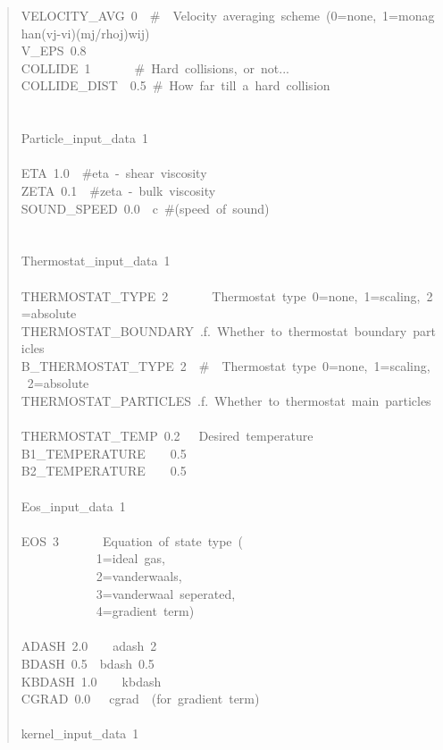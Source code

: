\begin{quote}
{VELOCITY{\_}AVG~0~~{\#}~~Velocity~averaging~scheme~(0=none,~1=monaghan(vj-vi)(mj/rhoj)wij)~\\
V{\_}EPS~0.8~\\
COLLIDE~1~~~~~~~{\#}~Hard~collisions,~or~not...~\\
COLLIDE{\_}DIST~~0.5~{\#}~How~far~till~a~hard~collision~\\
~\\
~\\
Particle{\_}input{\_}data~1~\\
~\\
ETA~1.0~~{\#}eta~-~shear~viscosity~\\
ZETA~0.1~~{\#}zeta~-~bulk~viscosity~\\
SOUND{\_}SPEED~0.0~~c~{\#}(speed~of~sound)~\\
~\\
~\\
Thermostat{\_}input{\_}data~1~\\
~\\
THERMOSTAT{\_}TYPE~2~~~~~~~Thermostat~type~0=none,~1=scaling,~2=absolute~\\
THERMOSTAT{\_}BOUNDARY~.f.~Whether~to~thermostat~boundary~particles~\\
B{\_}THERMOSTAT{\_}TYPE~2~~{\#}~~Thermostat~type~0=none,~1=scaling,~2=absolute~\\
THERMOSTAT{\_}PARTICLES~.f.~Whether~to~thermostat~main~particles~\\
THERMOSTAT{\_}TEMP~0.2~~~Desired~temperature~\\
B1{\_}TEMPERATURE~~~~0.5~\\
B2{\_}TEMPERATURE~~~~0.5~\\
~\\
Eos{\_}input{\_}data~1~\\
~\\
EOS~3~~~~~~~Equation~of~state~type~(~\\
~~~~~~~~~~~~1=ideal~gas,~\\
~~~~~~~~~~~~2=vanderwaals,~\\
~~~~~~~~~~~~3=vanderwaal~seperated,~\\
~~~~~~~~~~~~4=gradient~term)~\\
~\\
ADASH~2.0~~~~adash~2~\\
BDASH~0.5~~bdash~0.5~\\
KBDASH~1.0~~~~kbdash~\\
CGRAD~0.0~~~cgrad~~(for~gradient~term)~\\
~\\
kernel{\_}input{\_}data~1~\\
}
\end{quote}
